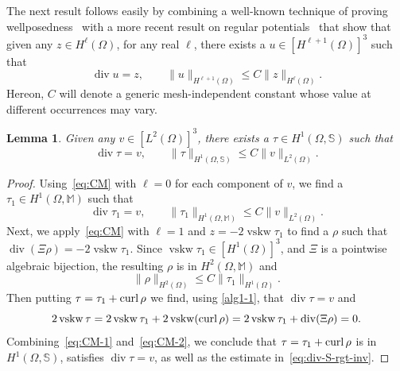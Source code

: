 \documentclass[12pt]{amsart}
\numberwithin{equation}{section}
\DeclareMathOperator{\divg}{div}
\newtheorem{lemma}[theorem]{Lemma}
\theoremstyle{definition}
\theoremstyle{remark}
\newcommand{\M}{\mathbb{M}}
\newcommand{\SSS}{\mathbb{S}}
\newcommand{\om}{{\Omega}}
\renewcommand{\(}{\bigl(}
\renewcommand{\)}{\bigr)}
\newcommand{\curl}{{\ensuremath\mathop{\mathrm{curl}\,}}}
\newcommand\vskw{\operatorname{vskw}}
\begin{document}
The next result follows easily by combining a well-known technique of
proving wellposedness~\cite{Falk08} with a more recent result on
regular potentials~\cite[Corollary~4.7]{costabel2010bogovskiui} that show that 
given any $z \in H^\ell(\om)$, for any real $\ell$, there exists a
$u \in [H^{\ell+1}(\om)]^3$ such that
\begin{equation}
  \label{eq:CM}
  \divg u = z, \qquad \| u \|_{H^{\ell+1}(\om)} \le C \| z \|_{H^\ell(\om)}.
\end{equation}
Hereon, $C$ will denote a generic mesh-independent constant whose
value at different occurrences may vary.

\begin{lemma}
  \label{lem:inf-sup}
  Given any $v \in [L^2(\om)]^3$, there exists a $\tau \in H^1(\om, \SSS)$ such that
  \begin{equation}
    \label{eq:div-S-rgt-inv}
    \divg \tau
    = v, \qquad 
  \|\tau\|_{H^1(\Omega, \SSS)} \le C \| v\|_{L^2(\Omega)}.    
  \end{equation}
\end{lemma}
\begin{proof}
  Using~\eqref{eq:CM} with $\ell=0$ for each
  component of $v$, we find a $\tau_1 \in H^1(\om, \M)$ such that
  \begin{equation}
    \label{eq:CM-1}
    \divg \tau_1 = v, \qquad \| \tau_1 \|_{H^1(\om, \M)} \le C \| v \|_{L^2(\om)}.
  \end{equation}
  Next, we apply~\eqref{eq:CM} with $\ell=1$ and $z=- 2 \vskw \tau_1$
  to find a $\rho$ such that $\divg (\Xi \rho) = - 2 \vskw
  \tau_1$. Since $\vskw \tau_1 \in [H^1(\om)]^3$, and $\Xi$ is a
  pointwise algebraic bijection, the resulting $\rho$ is in
  $H^2(\om, \M)$ and
  \begin{equation}
    \label{eq:CM-2}
    \| \rho \|_{H^2(\om)} \le C \| \tau_1 \|_{H^1(\om)}.
  \end{equation}
  Then putting
  $\tau = \tau_1 + \curl \rho$ we find, using \eqref{alg1-1}, that
  $ \divg \tau = v $ and
  \[
    2\vskw \tau =
    2\vskw \tau_1 + 2\vskw (\curl \rho) = 2\vskw \tau_1 + \divg (\Xi \rho) = 0. 
  \]
  Combining~\eqref{eq:CM-1} and~\eqref{eq:CM-2}, we conclude that
  $\tau = \tau_1 + \curl \rho$ is in
  $H^1(\Omega, \mathbb{S})$, satisfies $\divg \tau = v$, as well as 
  the estimate in~\eqref{eq:div-S-rgt-inv}.
\end{proof}
\end{document}
